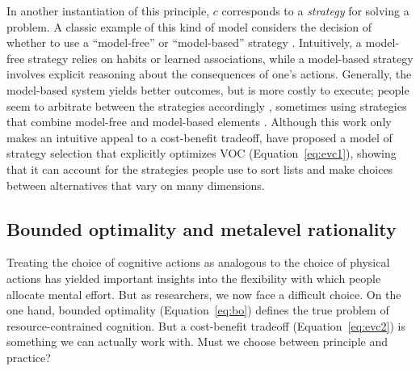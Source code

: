 
In another instantiation of this principle, $c$ corresponds to a \emph{strategy} for solving a problem. A classic example of this kind of model considers the decision of whether to use a ``model-free'' or ``model-based'' strategy \citep{daw2005uncertaintybased}. Intuitively, a model-free strategy relies on habits or learned associations, while a model-based strategy involves explicit reasoning about the consequences of one's actions. Generally, the model-based system yields better outcomes, but is more costly to execute; people seem to arbitrate between the strategies accordingly \citep{keramati2011speed,kool2017costbenefit}, sometimes using strategies that combine model-free and model-based elements \citep{keramati2016adaptive}. Although this work only makes an intuitive appeal to a cost-benefit tradeoff, \citet{lieder2017strategy} have proposed a model of strategy selection that explicitly optimizes VOC (Equation~\ref{eq:evc1}), showing that it can account for the strategies people use to sort lists and make choices between alternatives that vary on many dimensions.

\subsection{Bounded optimality and metalevel rationality}

Treating the choice of cognitive actions as analogous to the choice of physical actions has yielded important insights into the flexibility with which people allocate mental effort. But as researchers, we now face a difficult choice. On the one hand, bounded optimality (Equation~\ref{eq:bo}) defines the true problem of resource-contrained cognition. But a cost-benefit tradeoff (Equation~\ref{eq:evc2}) is something we can actually work with. Must we choose between principle and practice?

